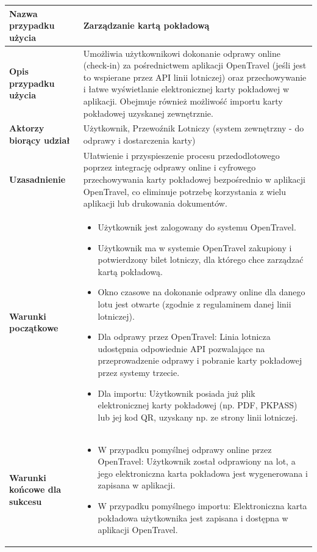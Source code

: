 \documentclass[a4paper,12pt]{article}
\begin{document}
\begin{longtable}{|p{\pierwszakolumnaszerokoscPUBLKartaPok}|p{\drugakolumnaszerokoscPUBLKartaPok}|}
    \textbf{Nazwa przypadku użycia} & Zarządzanie kartą pokładową \\
    \hline
    \textbf{Opis przypadku użycia} & Umożliwia użytkownikowi dokonanie odprawy online (check-in) za pośrednictwem aplikacji OpenTravel (jeśli jest to wspierane przez API linii lotniczej) oraz przechowywanie i łatwe wyświetlanie elektronicznej karty pokładowej w aplikacji. Obejmuje również możliwość importu karty pokładowej uzyskanej zewnętrznie. \\
    \hline
    \textbf{Aktorzy biorący udział} & Użytkownik, Przewoźnik Lotniczy (system zewnętrzny - do odprawy i dostarczenia karty) \\
    \hline
    \textbf{Uzasadnienie} & Ułatwienie i przyspieszenie procesu przedodlotowego poprzez integrację odprawy online i cyfrowego przechowywania karty pokładowej bezpośrednio w aplikacji OpenTravel, co eliminuje potrzebę korzystania z wielu aplikacji lub drukowania dokumentów. \\
    \hline
    \textbf{Warunki początkowe} &
        \begin{itemize} \itemsep0pt \parskip0pt \parsep0pt
            \item Użytkownik jest zalogowany do systemu OpenTravel.
            \item Użytkownik ma w systemie OpenTravel zakupiony i potwierdzony bilet lotniczy, dla którego chce zarządzać kartą pokładową.
            \item Okno czasowe na dokonanie odprawy online dla danego lotu jest otwarte (zgodnie z regulaminem danej linii lotniczej).
            \item Dla odprawy przez OpenTravel: Linia lotnicza udostępnia odpowiednie API pozwalające na przeprowadzenie odprawy i pobranie karty pokładowej przez systemy trzecie.
            \item Dla importu: Użytkownik posiada już plik elektronicznej karty pokładowej (np. PDF, PKPASS) lub jej kod QR, uzyskany np. ze strony linii lotniczej.
        \end{itemize} \\
    \hline
    \textbf{Warunki końcowe dla sukcesu} &
        \begin{itemize} \itemsep0pt \parskip0pt \parsep0pt
            \item W przypadku pomyślnej odprawy online przez OpenTravel: Użytkownik został odprawiony na lot, a jego elektroniczna karta pokładowa jest wygenerowana i zapisana w aplikacji.
            \item W przypadku pomyślnego importu: Elektroniczna karta pokładowa użytkownika jest zapisana i dostępna w aplikacji OpenTravel.

\end{itemize}
\end{longtable}
\end{document}
